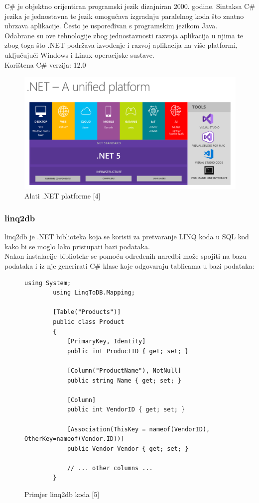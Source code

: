 \documentclass[zavrsnirad]{fer}
\begin{document}
C\# je objektno orijentiran programski jezik dizajniran 2000. godine. Sintaksa C\# jezika je jednostavna te jezik omogućava izgradnju paralelnog koda što znatno ubrzava aplikacije. Često je uspoređivan s programskim jezikom Java.
\\Odabrane su ove tehnologije zbog jednostavnosti razvoja aplikacija u njima te zbog toga što .NET podržava izvođenje i razvoj aplikacija na više platformi, uključujući Windows i Linux operacijske sustave.
\\Korištena C\# verzija: 12.0

\begin{figure}[htb]
	\centering
	\includegraphics[trim={0 0 15cm 5cm},clip,width=1\linewidth]{images/dotnet5_platform.png} 
	\caption{Alati .NET platforme [4]}
	\label{slk:dotnet}
\end{figure}
\FloatBarrier

\subsubsection{linq2db}
\label{pog:linq2db}
linq2db je .NET biblioteka koja se koristi za pretvaranje LINQ koda u SQL kod kako bi se moglo lako pristupati bazi podataka.
\\Nakon instalacije biblioteke se pomoću određenih naredbi može spojiti na bazu podataka i iz nje generirati C\# klase koje odgovaraju tablicama u bazi podataka:
\begin{figure}[htp]
	\centering
	\begin{lstlisting}[language=CSharp]
		using System;
		using LinqToDB.Mapping;
		
		[Table("Products")]
		public class Product
		{
			[PrimaryKey, Identity]
			public int ProductID { get; set; }
			
			[Column("ProductName"), NotNull]
			public string Name { get; set; }
			
			[Column]
			public int VendorID { get; set; }
			
			[Association(ThisKey = nameof(VendorID), OtherKey=nameof(Vendor.ID))]
			public Vendor Vendor { get; set; }
			
			// ... other columns ...
		}
	\end{lstlisting}
	\caption{Primjer linq2db koda [5]}
\end{figure}
\FloatBarrier
\end{document}

